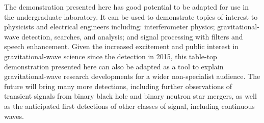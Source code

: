 \documentclass[paper-main.tex]{subfiles}
\begin{document}
The demonstration presented here has good potential to be adapted for use in the undergraduate laboratory. 
It can be used to demonstrate topics of interest to physicists and electrical engineers including: interferometer physics; gravitational-wave detection, searches, and analysis; and signal processing with filters and speech enhancement. 
Given the increased excitement and public interest in gravitational-wave science since the detection in 2015, this table-top demonstration presented here can also be adapted as a tool to explain gravitational-wave research developments for a wider non-specialist audience. 
The future will bring many more detections, including further observations of transient signals from binary black hole and binary neutron star mergers, as well as the anticipated first detections of other classes of signal, including continuous waves. 

\end{document}
